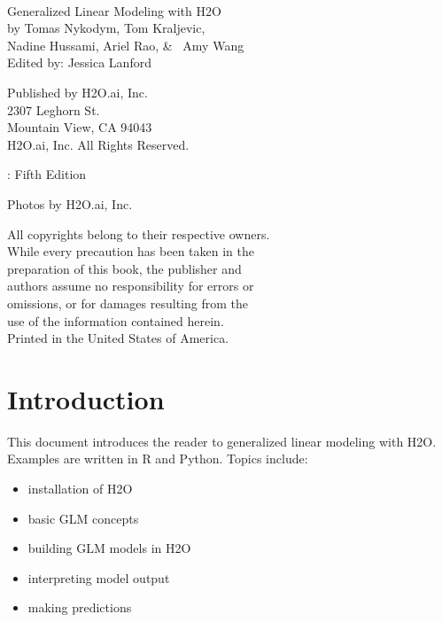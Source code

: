 \newpage
\restoregeometry

\null\vfill %

\thispagestyle{empty}%


{\raggedright\vfill\ 

Generalized Linear Modeling with H2O\\

by Tomas Nykodym, Tom Kraljevic, \\
Nadine Hussami, Ariel Rao,  \& \ Amy Wang \\
Edited by: Jessica Lanford

\bigskip
  Published by H2O.ai, Inc. \\
2307 Leghorn St. \\
Mountain View, CA 94043\\
\bigskip
\textcopyright \the\year \hspace{1pt} H2O.ai, Inc. All Rights Reserved. 
\bigskip

\monthname \hspace{1pt}  \the\year: Fifth Edition
\bigskip

Photos by \textcopyright H2O.ai, Inc.
\bigskip

All copyrights belong to their respective owners.\\
While every precaution has been taken in the\\
preparation of this book, the publisher and\\
authors assume no responsibility for errors or\\
omissions, or for damages resulting from the\\
use of the information contained herein.\\
\bigskip
Printed in the United States of America. 
}

\newpage
\thispagestyle{empty}%
\tableofcontents
\thispagestyle{empty}%



\newpage

\section{Introduction}
This document introduces the reader to generalized linear modeling with H2O.  Examples are written in R and Python.
Topics include: 
\begin{itemize}
\item installation of H2O
\item basic GLM concepts
\item building GLM models in H2O
\item interpreting model output
\item making predictions
\end{itemize}

